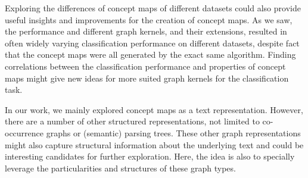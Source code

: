 Exploring the differences of concept maps of different datasets could also provide useful insights and improvements for the creation of concept maps.
As we saw, the performance and different graph kernels, and their extensions, resulted in often widely varying classification performance on different datasets, despite fact that the concept maps were all generated by the exact same algorithm.
Finding correlations between the classification performance and properties of concept maps might give new ideas for more suited graph kernels for the classification task.

In our work, we mainly explored concept maps as a text representation.
However, there are a number of other structured representations, not limited to co-occurrence graphs or (semantic) parsing trees.
These other graph representations might also capture structural information about the underlying text and could be interesting candidates for further exploration.
Here, the idea is also to specially leverage the particularities and structures of these graph types.

